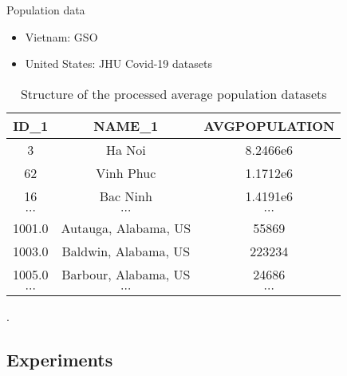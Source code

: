 \begin{frame}{Population data}

    \begin{itemize}
        \item Vietnam: \gls{GSO}
        \item United States: \gls{JHU} Covid-19 datasets
    \end{itemize}

    \begin{table}[h]
    \centering
    \begin{tabular}{| c | c | c |}
        ID\_1 & NAME\_1 & AVGPOPULATION \\
        \hline\hline
        3 & Ha Noi & 8.2466e6 \\
        \hline
        62 & Vinh Phuc & 1.1712e6 \\
        \hline
        16 & Bac Ninh & 1.4191e6 \\
        \hline
        $\cdots$ & $\cdots$ & $\cdots$ \\
        \hline
        1001.0 & Autauga, Alabama, US & 55869 \\
        \hline
        1003.0 & Baldwin, Alabama, US & 223234 \\
        \hline
        1005.0 & Barbour, Alabama, US & 24686 \\
        \hline
        $\cdots$ & $\cdots$ & $\cdots$ \\
    \end{tabular}
    \caption{Structure of the processed average population datasets}.
    \label{tab:country-subdivision-population}
    \end{table}

\end{frame}

\subsection{Experiments}

